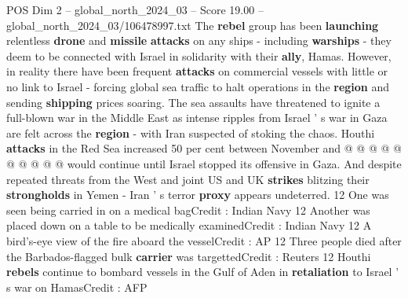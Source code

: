 \begin{textsample}{POS Dim 2 – global\_north\_2024\_03 – Score 19.00 – global\_north\_2024\_03/106478997.txt}
The \textbf{rebel} group has been \textbf{launching} relentless \textbf{drone} and \textbf{missile} \textbf{attacks} on any ships - including \textbf{warships} - they deem to be connected with Israel in solidarity with their \textbf{ally}, Hamas.
However, in reality there have been frequent \textbf{attacks} on commercial vessels with little or no link to Israel - forcing global sea traffic to halt operations in the \textbf{region} and sending \textbf{shipping} prices soaring.
The sea assaults have threatened to ignite a full-blown war in the Middle East as intense ripples from Israel ' s war in Gaza are felt across the \textbf{region} - with Iran suspected of stoking the chaos.
Houthi \textbf{attacks} in the Red Sea increased 50 per cent between November and @ @ @ @ @ @ @ @ @ @ would continue until Israel stopped its offensive in Gaza.
And despite repeated threats from the West and joint US and UK \textbf{strikes} blitzing their \textbf{strongholds} in Yemen - Iran ' s terror \textbf{proxy} appears undeterred. 12 One was seen being carried in on a medical bagCredit : Indian Navy 12 Another was placed down on a table to be medically examinedCredit : Indian Navy 12 A bird's-eye view of the fire aboard the vesselCredit : AP 12 Three people died after the Barbados-flagged bulk \textbf{carrier} was targettedCredit : Reuters 12 Houthi \textbf{rebels} continue to bombard vessels in the Gulf of Aden in \textbf{retaliation} to Israel ' s war on HamasCredit : AFP

\end{textsample}
